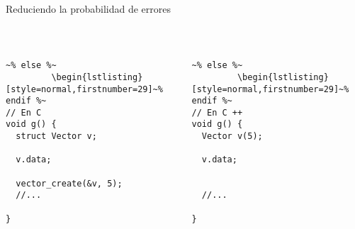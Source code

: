 \begin{frame}[fragile]{Reduciendo la probabilidad de errores}
                   ~%
                   ~%
   \begin{columns}[t]
      \begin{column}{.4\linewidth}
                   ~%
         \begin{lstlisting}[style=normal,firstnumber=29,linebackgroundcolor={%
                 \btLstHLB<1>{31}%
                 \btLstHLR<2>{33,35}%
                 \btLstHLR<3>{38}%
         }]~% else %~
         \begin{lstlisting}[style=normal,firstnumber=29]~% endif %~
// En C
void g() {
  struct Vector v;

  v.data;

  vector_create(&v, 5);
  //...

}
         \end{lstlisting}
     \end{column}
      \begin{column}{.4\linewidth}
                   ~%
         \begin{lstlisting}[style=normal,firstnumber=29,linebackgroundcolor={%
                 \btLstHLB<1>{31}%
                 \btLstHLB<2>{31,33}%
                 \btLstHLB<3>{38}%
         }]~% else %~
         \begin{lstlisting}[style=normal,firstnumber=29]~% endif %~
// En C ++
void g() {
  Vector v(5);

  v.data;


  //...

}
         \end{lstlisting}
     \end{column}
 \end{columns}
\end{frame}

